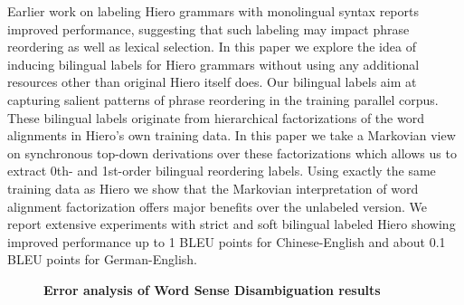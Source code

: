 \documentclass[10pt, a4paper, twopage, headinclude, footinclude, BCOR5mm]{scrartcl}
\begin{document}
\noindent
Earlier work on labeling Hiero grammars with monolingual syntax reports improved performance, suggesting that such labeling may impact phrase reordering as well  as lexical selection. In this paper we explore the idea of inducing bilingual labels for Hiero grammars without using any additional resources other than original Hiero itself does. Our bilingual labels aim at capturing salient patterns of phrase reordering in the training parallel corpus. These bilingual labels originate from hierarchical factorizations of the word alignments in Hiero’s own training data. In this paper we take a Markovian view on synchronous top-down derivations over these factorizations which allows us to extract 0th- and 1st-order bilingual reordering labels.  Using exactly the same training data as Hiero we show that the Markovian interpretation of word alignment factorization offers major benefits over the unlabeled version. We report extensive experiments with strict and soft bilingual labeled Hiero showing improved performance up to 1 BLEU points for Chinese-English  and about 0.1 BLEU points for German-English.


\newpage

\begin{figure}[t!]
\centering
\large\textbf{Error analysis of Word Sense Disambiguation results}
\vspace*{0.5cm}
\end{figure}


        \begin{table}[t!]
    \end{table}
\end{document}
